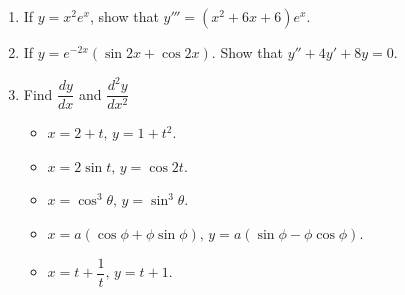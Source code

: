 \documentclass[titlepage,a4paper,12pt]{report}
\begin{document}
\begin{enumerate}
\begin{itemize}
\item[(iii)] $y=x^23^x$.
\item[(iv)] $y=\ln (x+\sqrt{1+x^2})$.
\item[(v)] $y=\ln (\ln \tan x)$.
\item[(vi)] $y=\tan ^2 e^{3x}$.
\end{itemize} 
\item If $y=x^2e^x$, show that $y'''=(x^2+6x+6)e^x$.
\item If $y=e^{-2x}(\sin 2x +\cos 2x)$. Show that $y''+4y'+8y=0$.
\item Find $\dfrac{dy}{dx}$ and $\dfrac{d^2y}{dx^2}$
\begin{itemize}
\item[(i)] $x=2+t, \, y=1+t^2$.
\item[(ii)] $x=2\sin t, \, y=\cos 2t$.
\item[(iii)] $x=\cos ^3 \theta , \, y=\sin ^3 \theta$.
\item[(iv)] $x=a(\cos \phi +\phi \sin \phi), \, y=a(\sin \phi -\phi \cos \phi)$.
\item[(v)] $x=t+\dfrac{1}{t}, \, y=t+1$.
\end{itemize}    
\end{enumerate}
\end{document}
